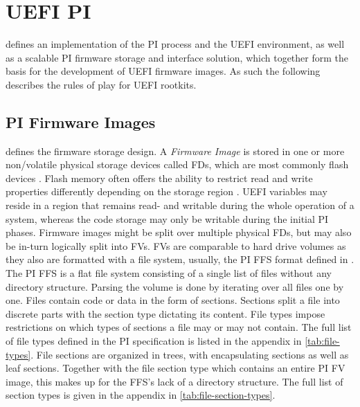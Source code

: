 
\section{\acs{UEFI} \acf{PI}}

\cite{pi-spec} defines an implementation of the \ac{PI} process and the \ac{UEFI} environment, as well as a scalable \ac{PI} firmware storage and interface solution, which together form the basis for the development of \ac{UEFI} firmware images.
As such the following describes the rules of play for \ac{UEFI} rootkits.

\subsection{\acs{PI} Firmware Images}
\label{sec:ueif-pi:pi:pi-firmware-images}

\cite[Vol. 3, 2]{pi-spec} defines the firmware storage design.
A \emph{Firmware Image} is stored in one or more non\-/volatile physical storage devices called \acp{FD}, which are most commonly flash devices \cite[Vol. 3, 2.1]{pi-spec}.
Flash memory often offers the ability to restrict read and write properties differently depending on the storage region \cite[Vol. 3, 2.1.1]{pi-spec}.
\ac{UEFI} variables may reside in a region that remains read- and writable during the whole operation of a system, whereas the code storage may only be writable during the initial \ac{PI} phases.
Firmware images might be split over multiple physical \acp{FD}, but may also be in-turn logically split into \acp{FV}.
\acp{FV} are comparable to hard drive volumes as they also are formatted with a file system, usually, the \ac{PI} \ac{FFS} format defined in \cite[Vol. 3, 2.2]{pi-spec}.
The \ac{PI} \ac{FFS} is a flat file system consisting of a single list of files without any directory structure.
Parsing the volume is done by iterating over all files one by one.
Files contain code or data in the form of sections.
Sections split a file into discrete parts with the section type dictating its content.
File types impose restrictions on which types of sections a file may or may not contain.
The full list of file types defined in the \ac{PI} specification is listed in the appendix in \autoref{tab:file-types}.
File sections are organized in trees, with encapsulating sections as well as leaf sections.
Together with the file section type  which contains an entire \ac{PI} \ac{FV} image, this makes up for the \ac{FFS}'s lack of a directory structure.
The full list of section types is given in the appendix in \autoref{tab:file-section-types}.

